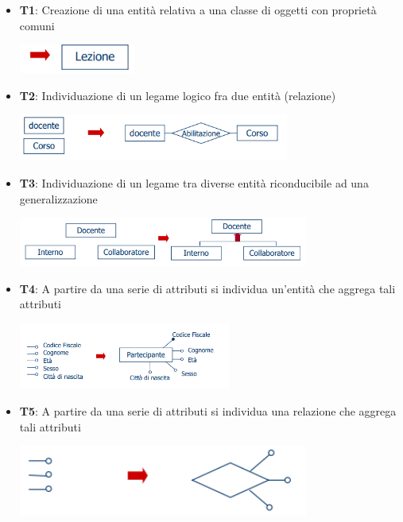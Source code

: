 \documentclass[12pt]{article}
\begin{document}
\begin{itemize}
    \item \textbf{T1}: Creazione di una entità relativa a una classe di oggetti con proprietà comuni
    \begin{center}
        \includegraphics[width = 0.30\textwidth]{Images/66.PNG}
    \end{center}
    \item \textbf{T2}: Individuazione di un legame logico fra due entità (relazione)
    \begin{center}
        \includegraphics[width = 0.70\textwidth]{Images/67.PNG}
    \end{center}
    \item \textbf{T3}: Individuazione di un legame tra diverse entità riconducibile ad una generalizzazione
    \begin{center}
        \includegraphics[width = 0.75\textwidth]{Images/68.PNG}
    \end{center}
    \item \textbf{T4}: A partire da una serie di attributi si individua un'entità che aggrega tali attributi
    \begin{center}
        \includegraphics[width = 0.55\textwidth]{Images/69.PNG}
    \end{center}
    \item \textbf{T5}: A partire da una serie di attributi si individua una relazione che aggrega tali attributi
    \begin{center}
        \includegraphics[width = 0.75\textwidth]{Images/70.PNG}
    \end{center}
\end{itemize}
\end{document}
